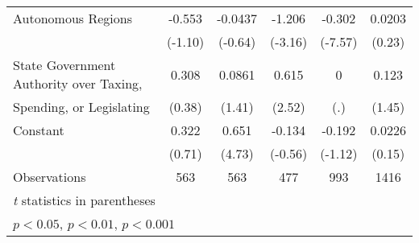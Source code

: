 \begin{table}[htbp]
\begin{tabular}{l*{5}{c}}
\addlinespace
Autonomous Regions                      &   -0.553         &  -0.0437         &   -1.206\sym{**} &   -0.302\sym{***}&   0.0203         \\
                                        &  (-1.10)         &  (-0.64)         &  (-3.16)         &  (-7.57)         &   (0.23)         \\
\addlinespace
State Government Authority over Taxing, &    0.308         &   0.0861         &    0.615\sym{*}  &        0         &    0.123         \\
Spending, or Legislating                &   (0.38)         &   (1.41)         &   (2.52)         &      (.)         &   (1.45)         \\
\addlinespace
Constant                                &    0.322         &    0.651\sym{***}&   -0.134         &   -0.192         &   0.0226         \\
                                        &   (0.71)         &   (4.73)         &  (-0.56)         &  (-1.12)         &   (0.15)         \\
\midrule
Observations                            &      563         &      563         &      477         &      993         &     1416         \\
\bottomrule
\multicolumn{6}{l}{\footnotesize \textit{t} statistics in parentheses}\\
\multicolumn{6}{l}{\footnotesize \sym{*} \(p<0.05\), \sym{**} \(p<0.01\), \sym{***} \(p<0.001\)}\\
\end{tabular}
\end{table}
